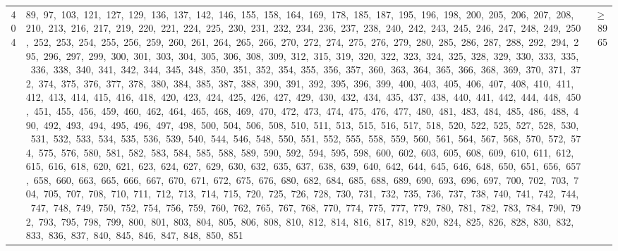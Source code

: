 \begin{longtable}{c|p{}|r}
404 & 89,\ 97,\ 103,\ 121,\ 127,\ 129,\ 136,\ 137,\ 142,\ 146,\ 155,\ 158,\ 164,\ 169,\ 178,\ 185,\ 187,\ 195,\ 196,\ 198,\ 200,\ 205,\ 206,\ 207,\ 208,\ 210,\ 213,\ 216,\ 217,\ 219,\ 220,\ 221,\ 224,\ 225,\ 230,\ 231,\ 232,\ 234,\ 236,\ 237,\ 238,\ 240,\ 242,\ 243,\ 245,\ 246,\ 247,\ 248,\ 249,\ 250,\ 252,\ 253,\ 254,\ 255,\ 256,\ 259,\ 260,\ 261,\ 264,\ 265,\ 266,\ 270,\ 272,\ 274,\ 275,\ 276,\ 279,\ 280,\ 285,\ 286,\ 287,\ 288,\ 292,\ 294,\ 295,\ 296,\ 297,\ 299,\ 300,\ 301,\ 303,\ 304,\ 305,\ 306,\ 308,\ 309,\ 312,\ 315,\ 319,\ 320,\ 322,\ 323,\ 324,\ 325,\ 328,\ 329,\ 330,\ 333,\ 335,\ 336,\ 338,\ 340,\ 341,\ 342,\ 344,\ 345,\ 348,\ 350,\ 351,\ 352,\ 354,\ 355,\ 356,\ 357,\ 360,\ 363,\ 364,\ 365,\ 366,\ 368,\ 369,\ 370,\ 371,\ 372,\ 374,\ 375,\ 376,\ 377,\ 378,\ 380,\ 384,\ 385,\ 387,\ 388,\ 390,\ 391,\ 392,\ 395,\ 396,\ 399,\ 400,\ 403,\ 405,\ 406,\ 407,\ 408,\ 410,\ 411,\ 412,\ 413,\ 414,\ 415,\ 416,\ 418,\ 420,\ 423,\ 424,\ 425,\ 426,\ 427,\ 429,\ 430,\ 432,\ 434,\ 435,\ 437,\ 438,\ 440,\ 441,\ 442,\ 444,\ 448,\ 450,\ 451,\ 455,\ 456,\ 459,\ 460,\ 462,\ 464,\ 465,\ 468,\ 469,\ 470,\ 472,\ 473,\ 474,\ 475,\ 476,\ 477,\ 480,\ 481,\ 483,\ 484,\ 485,\ 486,\ 488,\ 490,\ 492,\ 493,\ 494,\ 495,\ 496,\ 497,\ 498,\ 500,\ 504,\ 506,\ 508,\ 510,\ 511,\ 513,\ 515,\ 516,\ 517,\ 518,\ 520,\ 522,\ 525,\ 527,\ 528,\ 530,\ 531,\ 532,\ 533,\ 534,\ 535,\ 536,\ 539,\ 540,\ 544,\ 546,\ 548,\ 550,\ 551,\ 552,\ 555,\ 558,\ 559,\ 560,\ 561,\ 564,\ 567,\ 568,\ 570,\ 572,\ 574,\ 575,\ 576,\ 580,\ 581,\ 582,\ 583,\ 584,\ 585,\ 588,\ 589,\ 590,\ 592,\ 594,\ 595,\ 598,\ 600,\ 602,\ 603,\ 605,\ 608,\ 609,\ 610,\ 611,\ 612,\ 615,\ 616,\ 618,\ 620,\ 621,\ 623,\ 624,\ 627,\ 629,\ 630,\ 632,\ 635,\ 637,\ 638,\ 639,\ 640,\ 642,\ 644,\ 645,\ 646,\ 648,\ 650,\ 651,\ 656,\ 657,\ 658,\ 660,\ 663,\ 665,\ 666,\ 667,\ 670,\ 671,\ 672,\ 675,\ 676,\ 680,\ 682,\ 684,\ 685,\ 688,\ 689,\ 690,\ 693,\ 696,\ 697,\ 700,\ 702,\ 703,\ 704,\ 705,\ 707,\ 708,\ 710,\ 711,\ 712,\ 713,\ 714,\ 715,\ 720,\ 725,\ 726,\ 728,\ 730,\ 731,\ 732,\ 735,\ 736,\ 737,\ 738,\ 740,\ 741,\ 742,\ 744,\ 747,\ 748,\ 749,\ 750,\ 752,\ 754,\ 756,\ 759,\ 760,\ 762,\ 765,\ 767,\ 768,\ 770,\ 774,\ 775,\ 777,\ 779,\ 780,\ 781,\ 782,\ 783,\ 784,\ 790,\ 792,\ 793,\ 795,\ 798,\ 799,\ 800,\ 801,\ 803,\ 804,\ 805,\ 806,\ 808,\ 810,\ 812,\ 814,\ 816,\ 817,\ 819,\ 820,\ 824,\ 825,\ 826,\ 828,\ 830,\ 832,\ 833,\ 836,\ 837,\ 840,\ 845,\ 846,\ 847,\ 848,\ 850,\ 851 & $\ge$ 8965 \\

\end{longtable}
